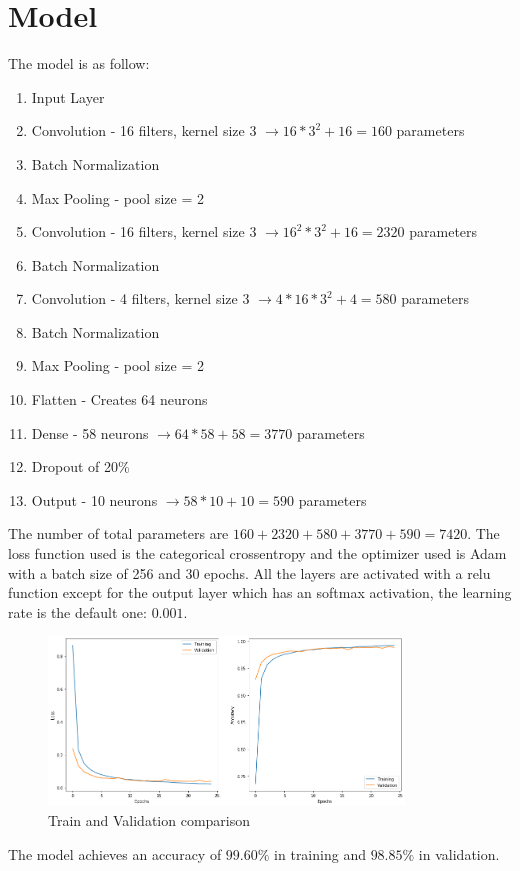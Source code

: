 \documentclass[11pt]{article}
\begin{document}
\section*{Model}
The model is as follow:
\begin{enumerate}[noitemsep,topsep=0ex]
	\item Input Layer
	\item Convolution - 16 filters, kernel size 3 $\to 16*3^2 + 16 = 160$ parameters
	\item Batch Normalization
	\item Max Pooling - pool size = 2
	\item Convolution - 16 filters, kernel size 3 $\to 16^2*3^2 + 16 = 2320$ parameters
	\item Batch Normalization
	\item Convolution - 4 filters, kernel size 3 $\to 4*16*3^2 + 4 = 580$ parameters
	\item Batch Normalization
	\item Max Pooling - pool size = 2
	\item Flatten - Creates 64 neurons
	\item Dense - 58 neurons $\to 64*58 + 58 = 3770$ parameters
	\item Dropout of 20\%
	\item Output - 10 neurons $\to 58*10 + 10 = 590$ parameters
\end{enumerate}
The number of total parameters are $160 + 2320 + 580 + 3770 + 590 = 7420$. The loss function used is the  categorical crossentropy and the optimizer used is Adam with a batch size of 256 and 30 epochs. All the layers are activated with a relu function except for the output layer which has an softmax activation, the learning rate is the default one: $0.001$.
\begin{figure}
	\centering
	\includegraphics[width=\linewidth,height=4.5cm]{imgs/ValidationVsTrain.png}
	\caption{Train and Validation comparison}
	\label{fig:valVsTest}
\end{figure}
The model achieves an accuracy of $99.60\%$ in training and $98.85\%$ in validation.
\end{document}
